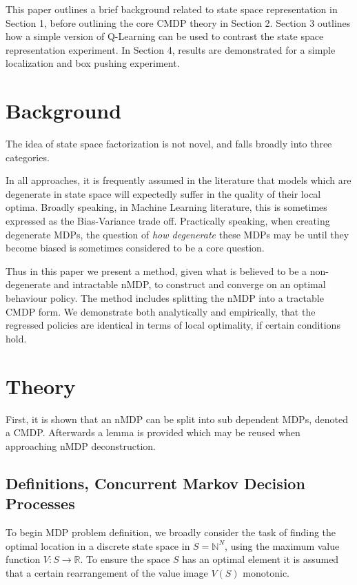 \documentclass[compsoc,journal,letterpaper,10pt,draftclsnofoot,onecolumn]{IEEEtran}
\begin{document}
This paper outlines a brief background related to state space
representation in Section 1, before outlining the core CMDP theory in
Section 2. Section 3 outlines how a simple version of Q-Learning can be
used to contrast the state space representation experiment. In Section
4, results are demonstrated for a simple localization and box pushing
experiment.

\section{Background}\label{background}

The idea of state space factorization is not novel, and falls broadly
into three categories.

In all approaches, it is frequently assumed in the literature that
models which are degenerate in state space will expectedly suffer in the
quality of their local optima. Broadly speaking, in Machine Learning
literature, this is sometimes expressed as the Bias-Variance trade off.
Practically speaking, when creating degenerate MDPs, the question of
\emph{how degenerate} these MDPs may be until they become biased is
sometimes considered to be a core question.

Thus in this paper we present a method, given what is believed to be a
non-degenerate and intractable nMDP, to construct and converge on an
optimal behaviour policy. The method includes splitting the nMDP into a
tractable CMDP form. We demonstrate both analytically and empirically,
that the regressed policies are identical in terms of local optimality,
if certain conditions hold.

\section{Theory}\label{theory}

First, it is shown that an nMDP can be split into sub dependent MDPs,
denoted a CMDP. Afterwards a lemma is provided which may be reused when
approaching nMDP deconstruction.

\subsection{Definitions, Concurrent Markov Decision
Processes}\label{definitions-concurrent-markov-decision-processes}

To begin MDP problem definition, we broadly consider the task of finding
the optimal location in a discrete state space in
\(S = \mathbb{N}^{N}\), using the maximum value function
\(V:S\rightarrow\mathbb{R}\). To ensure the space \(S\) has an
optimal element it is assumed that a certain rearrangement of the value
image \(V\left( S \right)\) monotonic.
\end{document}
